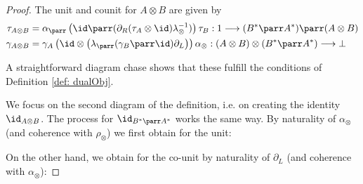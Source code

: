 \documentclass[DIN, pagenumber=false, fontsize=11pt, parskip=half, colorinlistoftodos, svgnames]{scrartcl}
\begin{document}
	\begin{proof}
		The unit and counit for $A \otimes B$ are given by 
		\begin{align*}
			\tau_{A\otimes B} 
			&= 
			\alpha_\parr
			\left(
				\id \parr (\partial_R(\tau_A \otimes \id)\lambda_\otimes^{-1}) 
			\right)
			\tau_B : 
			1 \longrightarrow (B^* \parr A^*) \parr (A \otimes B) 
			\\
			\gamma_{A \otimes B} 
			&= 
			\gamma_A 
			\left(
				\id \otimes 
				\left(
					\lambda_\parr (\gamma_B \parr \id) \partial_L 
				\right)
			\right)
			\alpha_\otimes :
			(A \otimes B) \otimes (B^* \parr A^*) \longrightarrow \bot
		\end{align*}
		
		A straightforward diagram chase shows that these fulfill the conditions of Definition \ref{def: dualObj}.
		
		We focus on the second diagram of the definition, i.e. on creating the identity $\id_{A \otimes B} $. The process for $\id_{B^* \parr A^*} $ works the same way.
		By  naturality of $\alpha_\otimes $ (and coherence with $\rho_\otimes$) we first obtain for the unit:
		
		\begin{center}
		\end{center}
		
		On the other hand, we obtain for the co-unit by naturality of $\partial_L$ (and coherence with $\alpha_\otimes$):
		

\end{proof}
\end{document}
